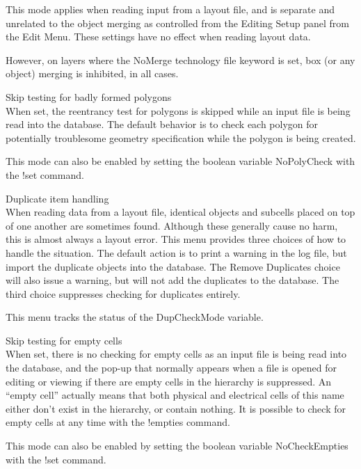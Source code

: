 \begin{description}
This mode applies when reading input from a layout file, and is
separate and unrelated to the object merging as controlled from the
{\cb Editing Setup} panel from the {\cb Edit Menu}.  These settings
have no effect when reading layout data.

However, on layers where the {\vt NoMerge} technology file keyword is
set, box (or any object) merging is inhibited, in all cases.

\item{\cb Skip testing for badly formed polygons}\\
When set, the reentrancy test for polygons is skipped while an input
file is being read into the database.  The default behavior is to
check each polygon for potentially troublesome geometry specification
while the polygon is being created.

This mode can also be enabled by setting the boolean variable {\et
NoPolyCheck} with the {\cb !set} command.

\item{\cb Duplicate item handling}\\
When reading data from a layout file, identical objects and subcells
placed on top of one another are sometimes found.  Although these
generally cause no harm, this is almost always a layout error.  This
menu provides three choices of how to handle the situation.  The
default action is to print a warning in the log file, but import the
duplicate objects into the database.  The {\cb Remove Duplicates}
choice will also issue a warning, but will not add the duplicates to
the database.  The third choice suppresses checking for duplicates
entirely.

This menu tracks the status of the {\et DupCheckMode} variable.

\item{\cb Skip testing for empty cells}\\
When set, there is no checking for empty cells as an input file is
being read into the database, and the pop-up that normally appears
when a file is opened for editing or viewing if there are empty cells
in the hierarchy is suppressed.  An ``empty cell'' actually means that
both physical and electrical cells of this name either don't exist in
the hierarchy, or contain nothing.  It is possible to check for empty
cells at any time with the {\cb !empties} command.

This mode can also be enabled by setting the boolean variable {\et
NoCheckEmpties} with the {\cb !set} command.


\end{description}
